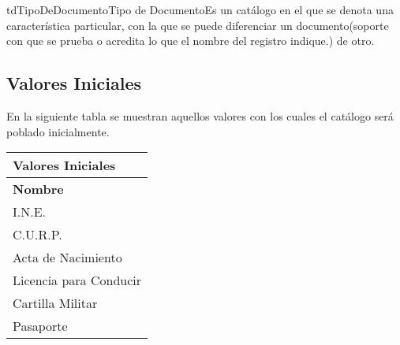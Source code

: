 	
	\begin{TipoDeDato}{tdTipoDeDocumento}{Tipo de Documento}{Es un catálogo en el que se denota una característica particular, con la que se puede diferenciar un documento(soporte con que se prueba o acredita lo que el nombre del registro indique.) de otro.}
	\begin{tdAtributos}	
	\end{tdAtributos}
	
	\subsection{Valores Iniciales}
	En la siguiente tabla se muestran aquellos valores con los cuales el catálogo será poblado inicialmente.\cdtEmpty

		\begin{longtable}{| p{}|}
	 			\rowcolor{colorPrincipal}
	 			\bf \color{white} Valores Iniciales\\
	 			\hline
	 			\rowcolor{colorSecundario}
	 			\bf \color{white} Nombre\\
	 			\hline
	 			I.N.E. \\
	 			\hline
	 			C.U.R.P.\\
	 			\hline
	 			Acta de Nacimiento \\
	 			\hline
	 			Licencia para Conducir \\
	 			\hline
	 			Cartilla Militar\\
	 			\hline
	 			Pasaporte\\
	 			\hline
	 		\end{longtable}
\end{TipoDeDato}

